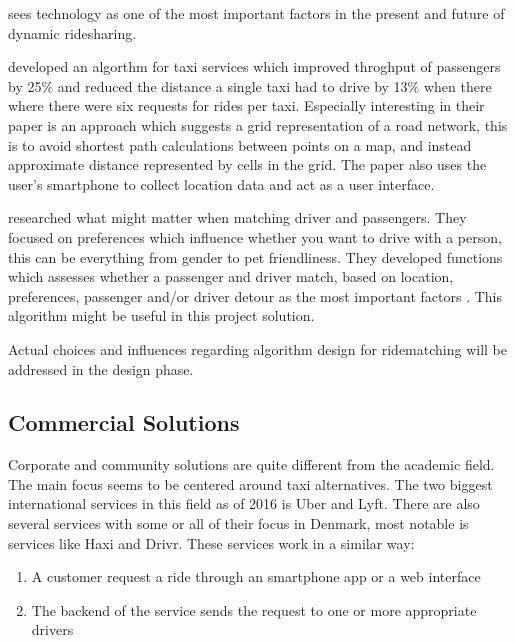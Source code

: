 \citet{doi:10.1080/01441647.2011.621557, amey2011real} sees technology as one of the most important factors in the present and future of dynamic ridesharing.

\citet{ShuoMa2013} developed an algorthm for taxi services which improved throghput of passengers by 25\% and reduced the distance a single taxi had to drive by 13\% when there where there were six requests for rides per taxi. %
Especially interesting in their paper is an approach which suggests a grid representation of a road network, this is to avoid shortest path calculations between points on a map, and instead approximate distance represented by cells in the grid.
The paper also uses	 the user's smartphone to collect location data and act as a user interface.

\citet{ghoseiri2011real} researched what might matter when matching driver and passengers.
They focused on preferences which influence whether you want to drive with a person, this can be everything from gender to pet friendliness.
They developed functions which assesses whether a passenger and driver match, based on location, preferences, passenger and/or driver detour as the most important factors \cite{ghoseiri2011real}.
This algorithm might be useful in this project solution.

Actual choices and influences regarding algorithm design for ridematching will be addressed in the design phase. 

\subsection{Commercial Solutions}
Corporate and community solutions are quite different from the academic field.
The main focus seems to be centered around taxi alternatives.
The two biggest international services in this field as of 2016 is Uber and Lyft.
There are also several services with some or all of their focus in Denmark, most notable is services like Haxi and Drivr.
These services work in a similar way: 

\begin{enumerate}
	\item A customer request a ride through an smartphone app or a web interface
	\item The backend of the service sends the request to one or more appropriate drivers
\end{enumerate}

